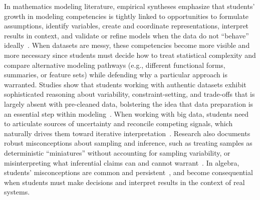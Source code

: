\documentclass[11pt]{article}
\begin{document}
In mathematics modeling literature, empirical syntheses emphasize that students’ growth in modeling competencies is tightly linked to opportunities to formulate assumptions, identify variables, create and coordinate representations, interpret results in context, and validate or refine models when the data do not ``behave'' ideally~\cite{schukajlow2018empirical, cevikbas2022systematic}.
When datasets are messy, these competencies become more visible and more necessary since students must decide how to treat statistical complexity and compare alternative modeling pathways (e.g., different functional forms, summaries, or feature sets) while defending why a particular approach is warranted. 
Studies show that students working with authentic datasets exhibit sophisticated reasoning about variability, constraint-setting, and trade-offs that is largely absent with pre-cleaned data, bolstering the idea that data preparation is an essential step within modeling~\cite{wilkerson2022exploring, english2018modelling}.
When working with big data, students need to articulate sources of uncertainty and reconcile competing signals, which naturally drives them toward iterative interpretation~\cite{gafny2025novices}. 
Research also documents robust misconceptions about sampling and inference, such as treating samples as deterministic ``miniatures'' without accounting for sampling variability, or misinterpreting what inferential claims can and cannot warrant~\cite{saldanha2002conceptions, sotos2007students}.
In algebra, students' misconceptions are common and persistent~\cite{knuth2005middle}, and become consequential when students must make decisions and interpret results in the context of real systems. 
\end{document}
